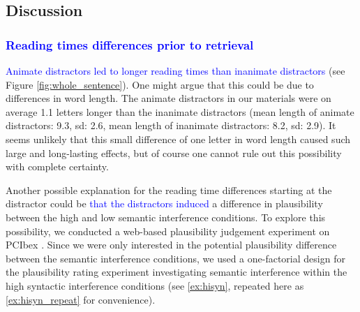 \documentclass[review,preprint,12pt,authoryear,floatsintext]{elsarticle}
\begin{document}
\subsection*{Discussion}

\subsubsection*{\textcolor{blue}{Reading times differences prior to retrieval}}\label{prior_to_retrieval}

\textcolor{blue}{Animate distractors led to longer reading times than inanimate distractors} (see Figure \ref{fig:whole_sentence}). One might argue that this could be due to differences in word length. The animate distractors in our materials were on average 1.1 letters longer than the inanimate distractors (mean length of animate distractors: 9.3, sd: 2.6, mean length of inanimate distractors: 8.2, sd: 2.9). It seems unlikely that this small difference of one letter in word length caused such large and long-lasting effects, but of course one cannot rule out this possibility with complete certainty.

Another possible explanation for the reading time differences starting at the distractor could be \textcolor{blue}{that the distractors induced} a difference in plausibility between the high and low semantic interference conditions. To explore this possibility, we conducted a web-based plausibility judgement experiment on PCIbex  \citep{pcibex}. Since we were only interested in the potential plausibility difference between the semantic interference conditions, we used a one-factorial design for the plausibility rating experiment investigating semantic interference within the high syntactic interference conditions (see \ref{ex:hisyn}, repeated here as \ref{ex:hisyn_repeat} for convenience).
\end{document}

